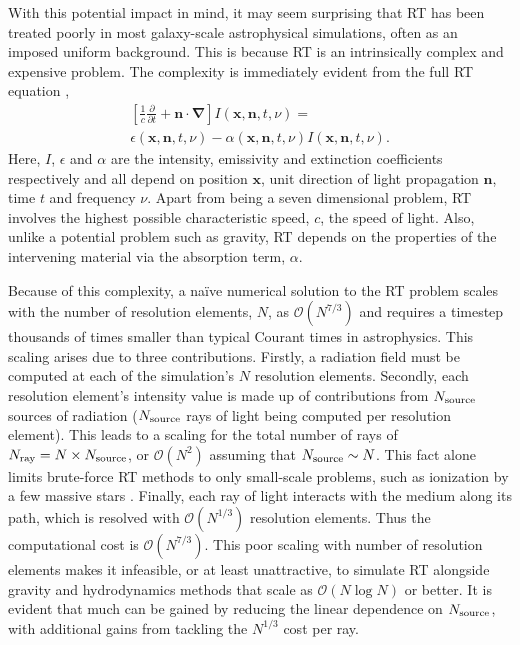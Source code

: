 \documentclass[fleq,usenatbib]{mnras}
\newcommand{\bigO}[1]{\mathcal{O}\left(#1\right)}
\newcommand{\NS}{N_{\rm source}}
\newcommand{\NR}{N_{\rm ray}}
\begin{document}
With this potential impact in mind, it may seem surprising that RT has been treated 
poorly in most galaxy-scale astrophysical simulations, often as an 
imposed uniform background. This is because RT is an intrinsically complex and 
expensive problem. The complexity is immediately evident from the 
full RT equation 
\citep[e.g.][]{mihalasMihalas84},
\begin{eqnarray} \label{eqn:classicrt}
\left[ \frac{1}{c} \frac{\partial}{\partial t} + \mathbf{n \cdot \nabla}
 \right] I\left(\mathbf{x}, \mathbf{n}, t, \nu\right) = \nonumber \\
\epsilon\left(\mathbf{x}, \mathbf{n}, t, \nu\right) - 
\alpha\left(\mathbf{x}, \mathbf{n}, t, \nu\right) 
I\left(\mathbf{x}, \mathbf{n}, t, \nu\right).
\end{eqnarray} 
Here, $I$, $\epsilon$ and $\alpha$ are the intensity, emissivity and 
extinction coefficients respectively and all depend on position $\mathbf{x}$, 
unit direction of light propagation $\mathbf{n}$, time $t$ and frequency 
$\nu$. Apart from being a seven dimensional problem, RT involves the highest 
possible characteristic speed, $c$, the speed of light. Also, unlike a 
potential problem such as gravity, RT depends on the properties of the 
intervening material via the absorption term, $\alpha$.

Because of this complexity, a na\"ive numerical solution to the RT problem 
scales with the number of resolution elements, $N$, as $\bigO{N^{7/3}}$ and 
requires a timestep thousands of times smaller than typical Courant times in 
astrophysics. This scaling arises due to three contributions. Firstly, a 
radiation field must be computed at each of the simulation's $N$ resolution 
elements. Secondly, each resolution element's intensity value is made up of 
contributions from $\NS$ sources of radiation ($\NS$ rays of light being 
computed per resolution element). This leads to a scaling for the total number 
of rays of $\NR = N \times \NS$, or $\bigO{N^2}$ assuming that $\NS \sim N$. 
This fact alone limits brute-force RT methods to only small-scale problems, 
such as ionization by a few massive stars \citep{howard16, 
howard17}. Finally, each ray of light interacts with the medium along its 
path, which is resolved with $\bigO{N^{1/3}}$ resolution elements. Thus the 
computational cost is $\bigO{N^{7/3}}$. This poor scaling with number of 
resolution elements makes it infeasible, or at least unattractive, to simulate 
RT alongside gravity and hydrodynamics methods that scale as $\bigO{N\log N}$ 
or better. It is evident that much can be gained by reducing the linear 
dependence on $\NS$, with additional gains from tackling the $N^{1/3}$ cost 
per ray.
\end{document}
